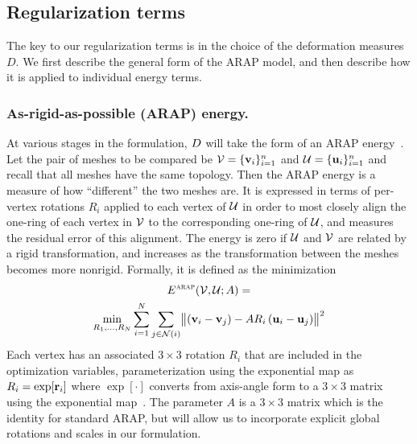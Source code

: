 \documentclass[preprint]{acmsiggraph}
\begin{document}
\subsection{Regularization terms}
The key to our regularization terms is in the choice of the deformation measures~$D$. We first describe the general form of the ARAP model, and then describe how it is applied to individual energy terms.


\subsubsection{As-rigid-as-possible (ARAP) energy.}
\def\earap{E^\text{\sc{arap}}}
At various stages in the formulation, $D$ will take the form of an ARAP energy~\cite{Sorkine:2007:ARA}.  Let the pair of meshes to be compared be $\mathcal{V} = \{\mathbf{v}_i\}_{i=1}^n$ and $\mathcal{U} = \{\mathbf{u}_i\}_{i=1}^n$ and recall that all meshes have the same topology.  Then the ARAP energy is a measure of how ``different'' the two meshes are.
It is expressed in terms of per-vertex rotations $R_i$ applied to each vertex of $\mathcal{U}$ in order to most closely align the one-ring of each vertex in $\mathcal{V}$ to the corresponding
one-ring of $\mathcal{U}$, and measures the residual error of this alignment.
The energy is zero if $\mathcal{U}$ and $\mathcal{V}$ are related by a rigid transformation, and increases as the transformation between the meshes becomes more nonrigid.
Formally, it is defined as the minimization 
\begin{multline}
\earap(\cV, \cU; A) =\\
 \min_{R_1,...,R_N} 
\sum_{i=1}^N \sum_{j\in\cN(i)} 
\bigl\| \left( \bv_i - \bv_j \right) - A R_i\left(\bu_i - \bu_j\right)\bigr\|^2
\label{eq:earap}
\end{multline}
Each vertex has an associated $3\times3$ rotation $R_i$ that are included in the optimization variables, parameterization using the exponential map as $R_i = \exp[\mathbf{r}_i]$
where $\exp[\cdot]$ converts from axis-angle form to a $3\times3$ matrix using the exponential map~\cite{Grassia00}.
The parameter $A$ is a $3\times3$ matrix which is the identity for standard ARAP, but will allow us to incorporate explicit global rotations and scales in our formulation. 
\end{document}
